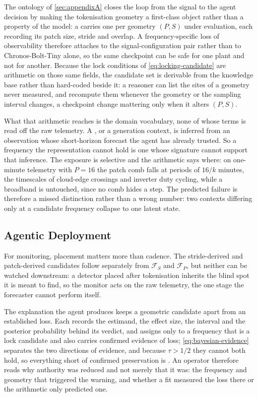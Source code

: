 The ontology of \autoref{sec:appendixA} closes the loop from the signal to the agent decision by making the tokenisation geometry a first-class object rather than a property of the model: a  carries one  per geometry $(P,S)$ under evaluation, each recording its patch size, stride and overlap. A frequency-specific loss of observability therefore attaches to the signal-configuration pair rather than to Chronos-Bolt-Tiny alone, so the same checkpoint can be safe for one plant and not for another. Because the lock conditions of \autoref{eq:locking-candidate} are arithmetic on those same fields, the candidate set is derivable from the knowledge base rather than hard-coded beside it: a reasoner can list the sites of a geometry never measured, and recompute them whenever the geometry or the sampling interval changes, a checkpoint change mattering only when it alters $(P,S)$.

What that arithmetic reaches is the domain vocabulary, none of whose terms is read off the raw telemetry. A , or a  generation context, is inferred from an observation whose short-horizon forecast the agent has already trusted. So a frequency the representation cannot hold is one whose signature cannot support that inference. The exposure is selective and the arithmetic says where: on one-minute telemetry with $P=16$ the patch comb falls at periods of $16/k$ minutes, the timescales of cloud-edge crossings and inverter duty cycling, while a broadband  is untouched, since no comb hides a step. The predicted failure is therefore a missed distinction rather than a wrong number: two contexts differing only at a candidate frequency collapse to one latent state.

\subsection*{Agentic Deployment}
For monitoring, placement matters more than cadence. The stride-derived and patch-derived candidates follow separately from $\mathcal{F}_{S}$ and $\mathcal{F}_{P}$, but neither can be watched downstream: a detector placed after tokenisation inherits the blind spot it is meant to find, so the monitor acts on the raw telemetry, the one stage the forecaster cannot perform itself.

The explanation the agent produces keeps a geometric candidate apart from an established loss. Each  records the estimand, the effect size, the interval and the posterior probability behind its verdict, and assigns  only to a frequency that is a lock candidate and also carries confirmed evidence of loss; \autoref{eq:bayesian-evidence} separates the two directions of evidence, and because $\tau>1/2$ they cannot both hold, so everything short of confirmed preservation is . An operator therefore reads why authority was reduced and not merely that it was: the frequency and geometry that triggered the warning, and whether a fit measured the loss there or the arithmetic only predicted one.


